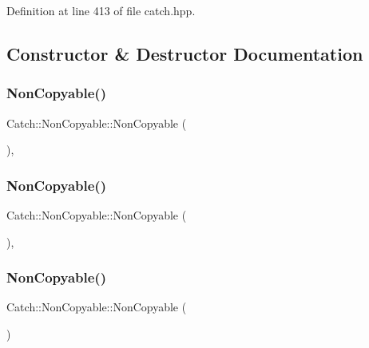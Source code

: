 Definition at line 413 of file catch.\+hpp.



\subsection{Constructor \& Destructor Documentation}
\mbox{\label{class_catch_1_1_non_copyable_a74cf3e4aa051c284941e39b436b2f693}} 
\subsubsection{NonCopyable()\hspace{0.1cm}{\footnotesize\ttfamily [1/3]}}
{\footnotesize\ttfamily Catch\+::\+Non\+Copyable\+::\+Non\+Copyable (\begin{DoxyParamCaption}\item[{\textbf{ Non\+Copyable} const \&}]{ }\end{DoxyParamCaption})\hspace{0.3cm}{\ttfamily [private]}, {\ttfamily [delete]}}

\mbox{\label{class_catch_1_1_non_copyable_a09d1d8775db8c495fa40c285b034faa3}} 
\subsubsection{NonCopyable()\hspace{0.1cm}{\footnotesize\ttfamily [2/3]}}
{\footnotesize\ttfamily Catch\+::\+Non\+Copyable\+::\+Non\+Copyable (\begin{DoxyParamCaption}\item[{\textbf{ Non\+Copyable} \&\&}]{ }\end{DoxyParamCaption})\hspace{0.3cm}{\ttfamily [private]}, {\ttfamily [delete]}}

\mbox{\label{class_catch_1_1_non_copyable_a4b492dd5753f9952350fb64dc6cb9fe2}} 
\subsubsection{NonCopyable()\hspace{0.1cm}{\footnotesize\ttfamily [3/3]}}
{\footnotesize\ttfamily Catch\+::\+Non\+Copyable\+::\+Non\+Copyable (\begin{DoxyParamCaption}{ }\end{DoxyParamCaption})\hspace{0.3cm}{\ttfamily [protected]}}

